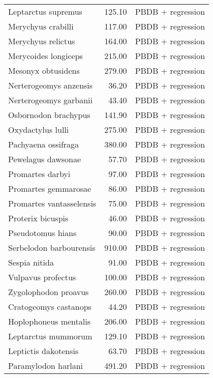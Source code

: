 \begin{table}[ht]
\begin{tabular}{lrl}
  Leptarctus supremus & 125.10 & PBDB + regression \\ 
  Merychyus crabilli & 117.00 & PBDB + regression \\ 
  Merychyus relictus & 164.00 & PBDB + regression \\ 
  Merycoides longiceps & 215.00 & PBDB + regression \\ 
  Mesonyx obtusidens & 279.00 & PBDB + regression \\ 
  Nerterogeomys anzensis & 36.20 & PBDB + regression \\ 
  Nerterogeomys garbanii & 43.40 & PBDB + regression \\ 
  Osbornodon brachypus & 141.90 & PBDB + regression \\ 
  Oxydactylus lulli & 275.00 & PBDB + regression \\ 
  Pachyaena ossifraga & 380.00 & PBDB + regression \\ 
  Pewelagus dawsonae & 57.70 & PBDB + regression \\ 
  Promartes darbyi & 97.00 & PBDB + regression \\ 
  Promartes gemmarosae & 86.00 & PBDB + regression \\ 
  Promartes vantasselensis & 75.00 & PBDB + regression \\ 
  Proterix bicuspis & 46.00 & PBDB + regression \\ 
  Pseudotomus hians & 90.00 & PBDB + regression \\ 
  Serbelodon barbourensis & 910.00 & PBDB + regression \\ 
  Sespia nitida & 91.00 & PBDB + regression \\ 
  Vulpavus profectus & 100.00 & PBDB + regression \\ 
  Zygolophodon proavus & 260.00 & PBDB + regression \\ 
  Cratogeomys castanops & 44.20 & PBDB + regression \\ 
  Hoplophoneus mentalis & 206.00 & PBDB + regression \\ 
  Leptarctus mummorum & 129.10 & PBDB + regression \\ 
  Leptictis dakotensis & 63.70 & PBDB + regression \\ 
  Paramylodon harlani & 491.20 & PBDB + regression \\ 
   \hline
\end{tabular}
\label{tab:mass_data}
\end{table}
